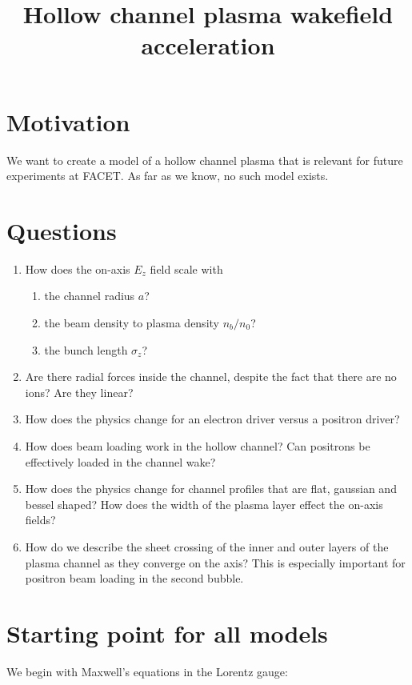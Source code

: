 \documentclass[aps,prl,preprint,groupedaddress]{revtex4-1}
\begin{document}
\title{Hollow channel plasma wakefield acceleration}

\maketitle

\section{Motivation}
We want to create a model of a hollow channel plasma that is relevant for future experiments at FACET. As far as we know, no such model exists.

\section{Questions}
\begin{enumerate}
	\item How does the on-axis $E_z$ field scale with 
	\begin{enumerate}
		\item the channel radius $a$?
		\item the beam density to plasma density 	$n_b/n_0$?
		\item the bunch length $\sigma_z$?
	\end{enumerate}
	\item Are there radial forces inside the channel, despite the fact that there are no ions? Are they linear?
	\item How does the physics change for an electron driver versus a positron driver?
	\item How does beam loading work in the hollow channel? Can positrons be effectively loaded in the channel wake?
	\item How does the physics change for channel profiles that are flat, gaussian and bessel shaped? How does the width of the plasma layer effect the on-axis fields?
	\item How do we describe the sheet crossing of the inner and outer layers of the plasma channel as they converge on the axis? This is especially important for positron beam loading in the second bubble.
\end{enumerate}

\section{Starting point for all models}

We begin with Maxwell's equations in the Lorentz gauge:
\end{document}
